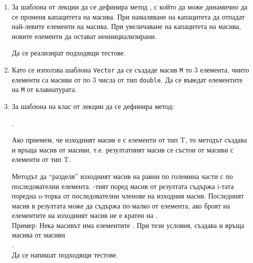 \begin{enumerate}[resume]
\item За шаблона  от лекции да се дефинира метод , с който да може динамично да се променя капацитета на масива. При намаляване на капацитета да отпадат най-левите елементи на масива. При увеличаване на капацитета на масива, новите елементи да остават неинициализирани.

Да се реализират подходящи тестове.

\item \label{zad:vectm} Като се използва шаблона \texttt{Vector} да се създаде масив \texttt{M} то 3 елемента, чиито елементи са масиви от по 3 числа от тип \texttt{double}. Да се въведат елементите на \texttt{M} от клавиатурата.


\item За шаблона на клас  от лекции да се дефинира метод:

 .

 Ако приемем, че изходният масив е  с елементи от тип T, то методът  създава и връща масив от масиви, т.е. резултатният масив се състои от масиви с елементи от тип T.

 Методът да ``разделя'' изходният масив на равни по големина части с по  последователни елемента. -тият поред масив от резултата съдържа i-тата поредна n-торка от последователни членове на изходния масив. Последният масив в резултата може да съдържа по-малко от  елемента, ако броят на елементите на изходният масив не е кратен на .\\

Пример: Нека масивът  има елементите \code{[1,2,3,4,5,6,7,8,10,11]}. При тези условия,  създава и връща масива от масиви\\ \code{[[1,2,3],[4,5,6],[7,8,9],[10,11]]}.\\


Да се напишат подходящи тестове.



\end{enumerate}


